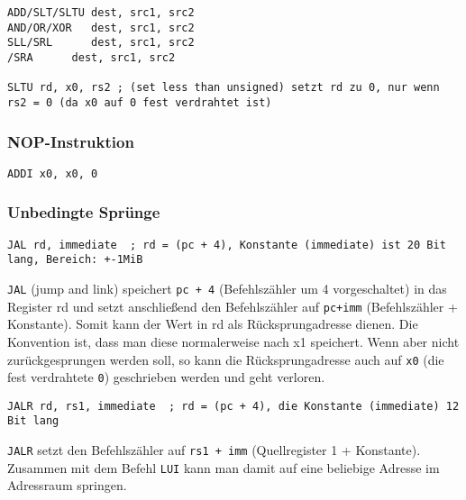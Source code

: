 \begin{lstlisting}[style=risc-v_Assembler]
ADD/SLT/SLTU dest, src1, src2
AND/OR/XOR   dest, src1, src2
SLL/SRL      dest, src1, src2
/SRA      dest, src1, src2

SLTU rd, x0, rs2 ; (set less than unsigned) setzt rd zu 0, nur wenn rs2 = 0 (da x0 auf 0 fest verdrahtet ist)
\end{lstlisting}

\subsubsection{NOP-Instruktion}

\begin{lstlisting}[style=risc-v_Assembler]
ADDI x0, x0, 0
\end{lstlisting}

\subsubsection{Unbedingte Sprünge}

\begin{lstlisting}[style=risc-v_Assembler]
JAL rd, immediate  ; rd = (pc + 4), Konstante (immediate) ist 20 Bit lang, Bereich: +-1MiB
\end{lstlisting}

\lstinline[style=risc-v_Assembler]!JAL! (jump and link) speichert \lstinline[style=risc-v_Assembler]!pc + 4! (Befehlszähler um 4 vorgeschaltet) in das Register rd und setzt anschließend den Befehlszähler auf \lstinline[style=risc-v_Assembler]!pc+imm! (Befehlszähler + Konstante). Somit kann der Wert in rd als Rücksprungadresse dienen. Die Konvention ist, dass man diese normalerweise nach x1 speichert. Wenn aber nicht zurückgesprungen werden soll, so kann die Rücksprungadresse auch auf \lstinline[style=risc-v_Assembler]!x0! (die fest verdrahtete \lstinline[style=risc-v_Assembler]!0!) geschrieben werden und geht verloren.

\begin{lstlisting}[style=risc-v_Assembler]
JALR rd, rs1, immediate  ; rd = (pc + 4), die Konstante (immediate) 12 Bit lang
\end{lstlisting}

\lstinline[style=risc-v_Assembler]!JALR! setzt den Befehlszähler auf \lstinline[style=risc-v_Assembler]!rs1 + imm! (Quellregister 1 + Konstante). Zusammen mit dem Befehl \lstinline[style=risc-v_Assembler]!LUI! kann
man damit auf eine beliebige Adresse im Adressraum springen.

